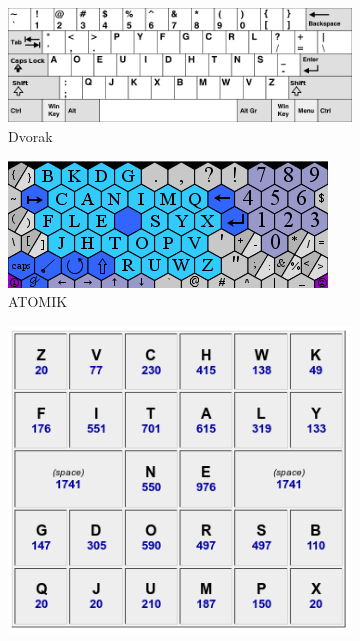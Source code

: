 \documentclass[times, utf8, zavrsni, numeric]{fer}
\begin{document}
\begin{figure}[htb]
  \centering
  \begin{subfigure}[b]{0.45\textwidth}
    \includegraphics[width=\textwidth]{img/dvorak.png}
    \caption{Dvorak}
    \label{fig:dvorak}
  \end{subfigure}
  \hfill
  \begin{subfigure}[b]{0.45\textwidth}
    \includegraphics[width=\textwidth]{img/atomik.png}
    \caption{ATOMIK}
    \label{fig:atomik}
  \end{subfigure}
  \begin{subfigure}[b]{0.45\textwidth}
    \includegraphics[width=\textwidth]{img/fitaly.png}

\end{subfigure}
\end{figure}
\end{document}
